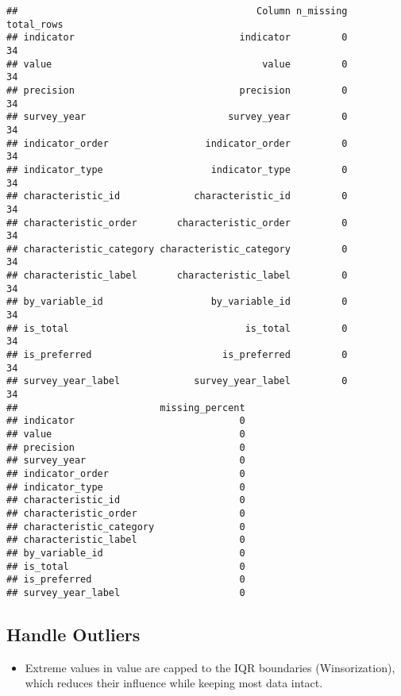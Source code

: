 \documentclass[
]{article}
\newenvironment{Shaded}{\begin{snugshade}}{\end{snugshade}}
\newcommand{\CommentTok}[1]{\textcolor[rgb]{0.56,0.35,0.01}{\textit{#1}}}
\newcommand{\FunctionTok}[1]{\textcolor[rgb]{0.13,0.29,0.53}{\textbf{#1}}}
\newcommand{\NormalTok}[1]{#1}
\newcommand{\SpecialCharTok}[1]{\textcolor[rgb]{0.81,0.36,0.00}{\textbf{#1}}}
\providecommand{\tightlist}{%
  \setlength{\itemsep}{0pt}\setlength{\parskip}{0pt}}
\begin{document}
\begin{verbatim}
##                                          Column n_missing total_rows
## indicator                             indicator         0         34
## value                                     value         0         34
## precision                             precision         0         34
## survey_year                         survey_year         0         34
## indicator_order                 indicator_order         0         34
## indicator_type                   indicator_type         0         34
## characteristic_id             characteristic_id         0         34
## characteristic_order       characteristic_order         0         34
## characteristic_category characteristic_category         0         34
## characteristic_label       characteristic_label         0         34
## by_variable_id                   by_variable_id         0         34
## is_total                               is_total         0         34
## is_preferred                       is_preferred         0         34
## survey_year_label             survey_year_label         0         34
##                         missing_percent
## indicator                             0
## value                                 0
## precision                             0
## survey_year                           0
## indicator_order                       0
## indicator_type                        0
## characteristic_id                     0
## characteristic_order                  0
## characteristic_category               0
## characteristic_label                  0
## by_variable_id                        0
## is_total                              0
## is_preferred                          0
## survey_year_label                     0
\end{verbatim}

\subsection{Handle Outliers}\label{handle-outliers}

\begin{itemize}
\tightlist
\item
  Extreme values in value are capped to the IQR boundaries
  (Winsorization), which reduces their influence while keeping most data
  intact.
\end{itemize}

\begin{Shaded}
\end{Shaded}
\end{document}
